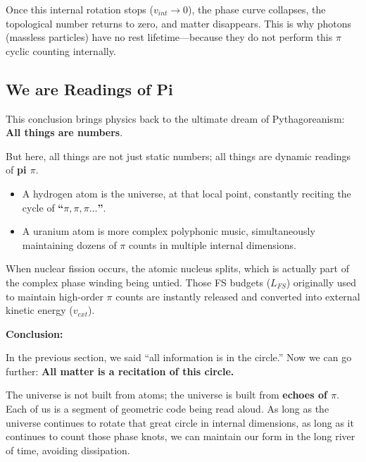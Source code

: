 Once this internal rotation stops ($v_{int} \to 0$), the phase curve collapses, the topological number returns to zero, and matter disappears. This is why photons (massless particles) have no rest lifetime---because they do not perform this $\pi$ cyclic counting internally.

\subsection{We are Readings of Pi}

This conclusion brings physics back to the ultimate dream of Pythagoreanism: \textbf{All things are numbers}.

But here, all things are not just static numbers; all things are dynamic readings of \textbf{pi $\pi$}.

\begin{itemize}
\item A hydrogen atom is the universe, at that local point, constantly reciting the cycle of \textbf{``$\pi, \pi, \pi\ldots$''}.

\item A uranium atom is more complex polyphonic music, simultaneously maintaining dozens of $\pi$ counts in multiple internal dimensions.
\end{itemize}

When nuclear fission occurs, the atomic nucleus splits, which is actually part of the complex phase winding being untied. Those FS budgets ($L_{FS}$) originally used to maintain high-order $\pi$ counts are instantly released and converted into external kinetic energy ($v_{ext}$).

\textbf{Conclusion:}

In the previous section, we said ``all information is in the circle.'' Now we can go further: \textbf{All matter is a recitation of this circle.}

The universe is not built from atoms; the universe is built from \textbf{echoes of $\pi$}. Each of us is a segment of geometric code being read aloud. As long as the universe continues to rotate that great circle in internal dimensions, as long as it continues to count those phase knots, we can maintain our form in the long river of time, avoiding dissipation.

